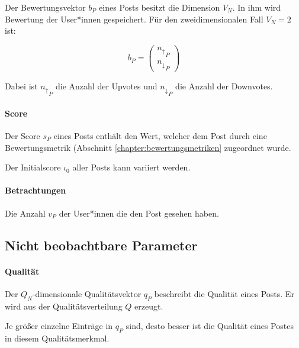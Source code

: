 Der Bewertungsvektor $b_P$ eines Posts besitzt die Dimension $V_N$. In ihm wird Bewertung der User*innen gespeichert. Für den zweidimensionalen Fall $V_N = 2$ ist:

\begin{equation}
b_P = \begin{pmatrix}
{n_\uparrow}_P \\
{n_\downarrow}_P 
\end{pmatrix}
\end{equation}

Dabei ist ${n_\uparrow}_P$ die Anzahl der Upvotes und ${n_\downarrow}_P$ die Anzahl der Downvotes.

\paragraph{Score}

Der Score $s_P$ eines Posts enthält den Wert, welcher dem Post durch eine Bewertungsmetrik (Abschnitt \ref{chapter:bewertungsmetriken} zugeordnet wurde.

Der Initialscore $\iota_{0}$ aller Posts kann variiert werden.

\paragraph{Betrachtungen}

Die Anzahl $v_P$ der User*innen die den Post gesehen haben.

\subsection{Nicht beobachtbare Parameter}

\paragraph{Qualität}
\label{pqualitaet}

Der $Q_N$-dimensionale Qualitätsvektor $q_P$ beschreibt die Qualität eines Posts. Er wird aus der Qualitätsverteilung $Q$ erzeugt. 

Je größer einzelne Einträge in $q_P$ sind, desto besser ist die Qualität eines Postes in diesem Qualitätsmerkmal.


